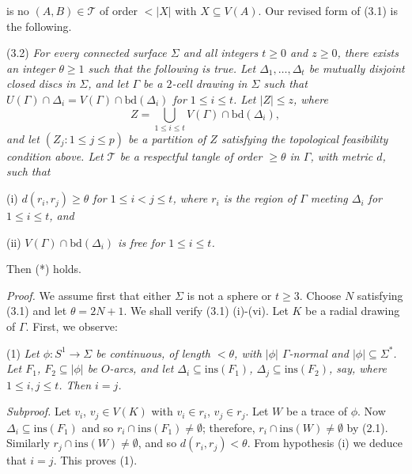\noindent is no $(A, B) \in \mathscr{T}$ of order $< |X|$ with $X \subseteq V(A)$. Our revised form of (3.1) is the following.

\stmt
(3.2) \textit{For every connected surface $\Sigma$ and all integers $t \ge 0$ and $z \ge 0$, there exists an integer $\theta \ge 1$ such that the following is true. Let $\Delta_1, \dots, \Delta_t$ be mutually disjoint closed discs in $\Sigma$, and let $\Gamma$ be a $2$-cell drawing in $\Sigma$ such that $U(\Gamma) \cap \Delta_i = V(\Gamma) \cap \text{bd}(\Delta_i)$ for $1 \le i \le t$. Let $|Z| \le z$, where}
\begin{equation*}
Z = \bigcup_{1 \le i \le t} V(\Gamma) \cap \text{bd}(\Delta_i),
\end{equation*}
\textit{and let $(Z_j \colon 1 \le j \le p)$ be a partition of $Z$ satisfying the topological feasibility condition above. Let $\mathscr{T}$ be a respectful tangle of order $\ge \theta$ in $\Gamma$, with metric $d$, such that}

\hspace*{12pt}(i) \textit{$d(r_i, r_j) \ge \theta$ for $1 \le i < j \le t$, where $r_i$ is the region of $\Gamma$ meeting $\Delta_i$ for $1 \le i \le t$, and}

\hspace*{12pt}(ii) \textit{$V(\Gamma) \cap \text{bd}(\Delta_i)$ is free for $1 \le i \le t$.}

Then (*) holds.

\textit{Proof.} We assume first that either $\Sigma$ is not a sphere or $t \ge 3$. Choose $N$ satisfying (3.1) and let $\theta = 2N + 1$. We shall verify (3.1) (i)-(vi). Let $K$ be a radial drawing of $\Gamma$. First, we observe:

\hspace*{12pt}(1) \textit{Let $\phi \colon S^1 \to \Sigma$ be continuous, of length $< \theta$, with $|\phi|$ $\Gamma$-normal and $|\phi| \subseteq \Sigma^*$. Let $F_1$, $F_2 \subseteq |\phi|$ be $O$-arcs, and let $\Delta_i \subseteq \text{ins}(F_1)$, $\Delta_j \subseteq \text{ins}(F_2)$, say, where $1 \le i, j \le t$. Then $i = j$.}

\textit{Subproof.} Let $v_i$, $v_j \in V(K)$ with $v_i \in r_i$, $v_j \in r_j$. Let $W$ be a trace of $\phi$. Now $\Delta_i \subseteq \text{ins}(F_1)$ and so $r_i \cap \text{ins}(F_1) \ne \emptyset$; therefore, $r_i \cap \text{ins}(W) \ne \emptyset$ by (2.1). Similarly $r_j \cap \text{ins}(W) \ne \emptyset$, and so $d(r_i, r_j) < \theta$. From hypothesis (i) we deduce that $i = j$. This proves (1).

